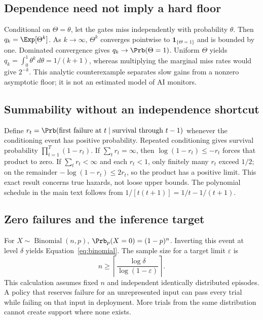 \subsection{Dependence need not imply a hard floor}
\label{app:dependence}
Conditional on $\Theta=\theta$, let the gates miss independently with probability $\theta$. Then $q_k=\Exp[\Theta^k]$. As $k\to\infty$, $\Theta^k$ converges pointwise to $\mathbf1_{\{\Theta=1\}}$ and is bounded by one. Dominated convergence gives $q_k\to\Prb(\Theta=1)$. Uniform $\Theta$ yields $q_k=\int_0^1\theta^k\,d\theta=1/(k+1)$, whereas multiplying the marginal miss rates would give $2^{-k}$. This analytic counterexample separates slow gains from a nonzero asymptotic floor; it is not an estimated model of AI monitors.

\subsection{Summability without an independence shortcut}
Define $r_t=\Prb(\text{first failure at }t\mid\text{survival through }t-1)$ whenever the conditioning event has positive probability. Repeated conditioning gives survival probability $\prod_{t=1}^{T}(1-r_t)$. If $\sum_t r_t=\infty$, then $\log(1-r_t)\le-r_t$ forces that product to zero. If $\sum_t r_t<\infty$ and each $r_t<1$, only finitely many $r_t$ exceed $1/2$; on the remainder $-\log(1-r_t)\le2r_t$, so the product has a positive limit. This exact result concerns true hazards, not loose upper bounds. The polynomial schedule in the main text follows from $1/[t(t+1)]=1/t-1/(t+1)$.

\subsection{Zero failures and the inference target}
For $X\sim\operatorname{Binomial}(n,p)$, $\Prb_p(X=0)=(1-p)^n$. Inverting this event at level $\delta$ yields Equation~\eqref{eq:binomial}. The sample size for a target limit $\varepsilon$ is
\[
n\ge\left\lceil\frac{\log\delta}{\log(1-\varepsilon)}\right\rceil.
\]
This calculation assumes fixed $n$ and independent identically distributed episodes. A policy that reserves failure for an unrepresented input can pass every trial while failing on that input in deployment. More trials from the same distribution cannot create support where none exists.
